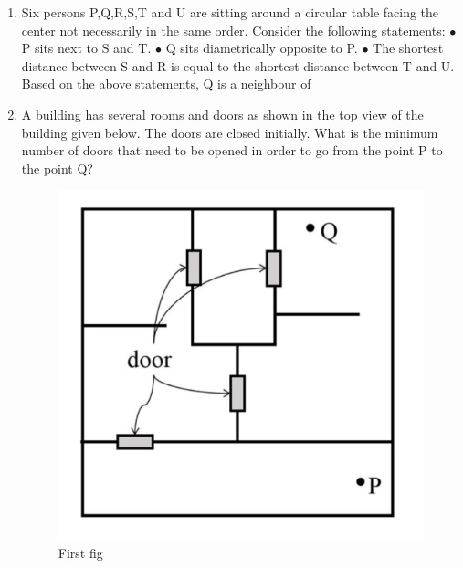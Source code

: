 \documentclass[journal]{IEEEtran}
\numberwithin{equation}{enumi}
\numberwithin{figure}{enumi}
\begin{document}
\begin{enumerate}[start=1, label={Q\arabic*.}]
\begin{enumerate}
  \end{enumerate}
\item Six persons P,Q,R,S,T and U are sitting around a circular table facing the center not necessarily in the same order. Consider the following statements: \newline
$\bullet$ \; P sits next to S and T.\newline
$\bullet$ \; Q sits diametrically opposite to P.\newline
$\bullet$ \;The shortest distance between S and R is equal to the shortest distance between T and U.\newline
Based on the above statements, Q is a neighbour of 
\begin{enumerate} 
  \end{enumerate}
\item A building has several rooms and doors as shown in the top view of the building given below. The doors are closed initially. What is the minimum number of doors that need to be opened in order to go from the point P to the point Q?
\begin{figure}[H]
    \centering
    \includegraphics[width=0.5\linewidth]{figs/fig1.jpeg}
    \caption{First fig}
    \label{fig:first}
\end{figure}
\begin{enumerate} 
\end{enumerate}
\end{enumerate}
\end{document}
